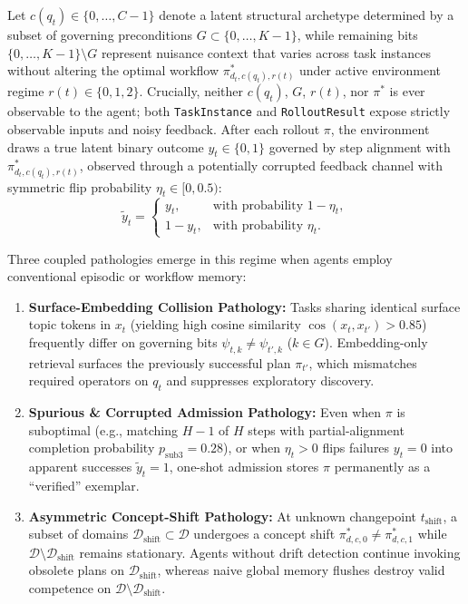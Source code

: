 \documentclass[10pt,letterpaper]{article}
\begin{document}
Let $c(q_t) \in \{0, \dots, C-1\}$ denote a latent structural archetype determined by a subset of governing preconditions $G \subset \{0, \dots, K-1\}$, while remaining bits $\{0, \dots, K-1\} \setminus G$ represent nuisance context that varies across task instances without altering the optimal workflow $\pi^*_{d_t, c(q_t), r(t)}$ under active environment regime $r(t) \in \{0, 1, 2\}$. Crucially, neither $c(q_t)$, $G$, $r(t)$, nor $\pi^*$ is ever observable to the agent; both \texttt{TaskInstance} and \texttt{RolloutResult} expose strictly observable inputs and noisy feedback. After each rollout $\pi$, the environment draws a true latent binary outcome $y_t \in \{0, 1\}$ governed by step alignment with $\pi^*_{d_t, c(q_t), r(t)}$, observed through a potentially corrupted feedback channel with symmetric flip probability $\eta_t \in [0, 0.5)$:
\begin{equation}
  \tilde{y}_t =
  \begin{cases}
    y_t, & \text{with probability } 1 - \eta_t, \\
    1 - y_t, & \text{with probability } \eta_t.
  \end{cases}
  \label{eq:noisy_channel}
\end{equation}

Three coupled pathologies emerge in this regime when agents employ conventional episodic or workflow memory:
\begin{enumerate}
  \item \textbf{Surface-Embedding Collision Pathology:} Tasks sharing identical surface topic tokens in $x_t$ (yielding high cosine similarity $\cos(x_t, x_{t'}) > 0.85$) frequently differ on governing bits $\psi_{t,k} \neq \psi_{t',k}$ ($k \in G$). Embedding-only retrieval surfaces the previously successful plan $\pi_{t'}$, which mismatches required operators on $q_t$ and suppresses exploratory discovery.
  \item \textbf{Spurious \& Corrupted Admission Pathology:} Even when $\pi$ is suboptimal (e.g., matching $H-1$ of $H$ steps with partial-alignment completion probability $p_{\mathrm{sub3}} = 0.28$), or when $\eta_t > 0$ flips failures $y_t=0$ into apparent successes $\tilde{y}_t=1$, one-shot admission stores $\pi$ permanently as a ``verified'' exemplar.
  \item \textbf{Asymmetric Concept-Shift Pathology:} At unknown changepoint $t_{\mathrm{shift}}$, a subset of domains $\mathcal{D}_{\mathrm{shift}} \subset \mathcal{D}$ undergoes a concept shift $\pi^*_{d, c, 0} \neq \pi^*_{d, c, 1}$ while $\mathcal{D} \setminus \mathcal{D}_{\mathrm{shift}}$ remains stationary. Agents without drift detection continue invoking obsolete plans on $\mathcal{D}_{\mathrm{shift}}$, whereas naive global memory flushes destroy valid competence on $\mathcal{D} \setminus \mathcal{D}_{\mathrm{shift}}$.
\end{enumerate}
\end{document}
